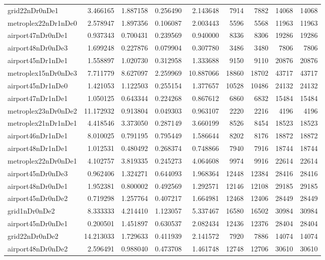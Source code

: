 \begin{longtable}{|l|r|r|r|r|r|r|r|r|}
grid22nDr0nDe1 & 3.466165 & 1.887158 & 0.256490 & 2.143648 & 7914 & 7882 & 14068 & 14068 \\
metroplex22nDr1nDe0 & 2.578947 & 1.897356 & 0.106087 & 2.003443 & 5596 & 5568 & 11963 & 11963 \\
airport47nDr0nDe1 & 0.937343 & 0.700431 & 0.239569 & 0.940000 & 8336 & 8306 & 19286 & 19286 \\
airport48nDr0nDe3 & 1.699248 & 0.227876 & 0.079904 & 0.307780 & 3486 & 3480 & 7806 & 7806 \\
airport45nDr1nDe1 & 1.558897 & 1.020730 & 0.312958 & 1.333688 & 9150 & 9110 & 20876 & 20876 \\
metroplex15nDr0nDe3 & 7.711779 & 8.627097 & 2.259969 & 10.887066 & 18860 & 18702 & 43717 & 43717 \\
airport45nDr1nDe0 & 1.421053 & 1.122503 & 0.255154 & 1.377657 & 10528 & 10486 & 24132 & 24132 \\
airport47nDr1nDe1 & 1.050125 & 0.643344 & 0.224268 & 0.867612 & 6860 & 6832 & 15484 & 15484 \\
metroplex23nDr0nDe2 & 11.172932 & 0.913804 & 0.049303 & 0.963107 & 2220 & 2216 & 4196 & 4196 \\
metroplex21nDr1nDe1 & 4.418546 & 3.373050 & 0.287149 & 3.660199 & 8526 & 8454 & 18523 & 18523 \\
airport46nDr1nDe1 & 8.010025 & 0.791195 & 0.795449 & 1.586644 & 8202 & 8176 & 18872 & 18872 \\
airport48nDr1nDe1 & 1.012531 & 0.480492 & 0.268374 & 0.748866 & 7940 & 7916 & 18744 & 18744 \\
metroplex22nDr0nDe1 & 4.102757 & 3.819335 & 0.245273 & 4.064608 & 9974 & 9916 & 22614 & 22614 \\
airport45nDr0nDe3 & 0.962406 & 1.324271 & 0.644093 & 1.968364 & 12448 & 12384 & 28416 & 28416 \\
airport48nDr0nDe1 & 1.952381 & 0.800002 & 0.492569 & 1.292571 & 12146 & 12108 & 29185 & 29185 \\
airport45nDr0nDe2 & 0.719298 & 1.257764 & 0.407217 & 1.664981 & 12468 & 12406 & 28449 & 28449 \\
grid1nDr0nDe2 & 8.333333 & 4.214410 & 1.123057 & 5.337467 & 16580 & 16502 & 30984 & 30984 \\
airport45nDr0nDe1 & 0.200501 & 1.451897 & 0.630537 & 2.082434 & 12436 & 12376 & 28404 & 28404 \\
grid22nDr0nDe2 & 14.213033 & 1.729633 & 0.411939 & 2.141572 & 7920 & 7886 & 14074 & 14074 \\
airport48nDr0nDe2 & 2.596491 & 0.988040 & 0.473708 & 1.461748 & 12748 & 12706 & 30610 & 30610 \\

\end{longtable}

